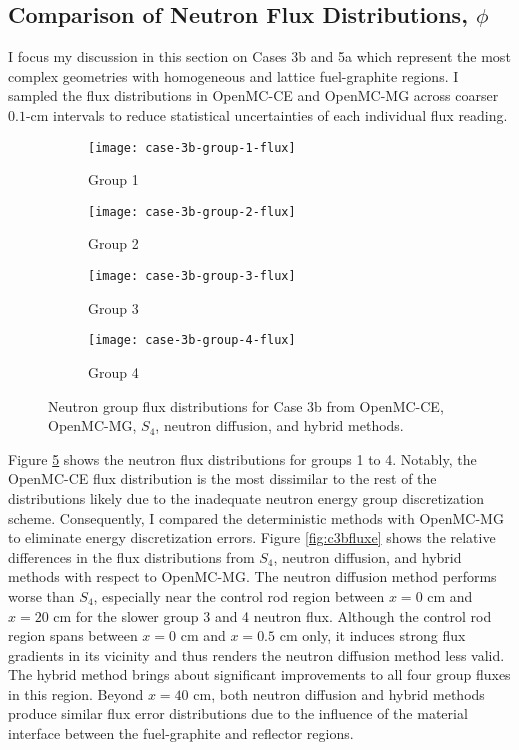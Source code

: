\subsection{Comparison of Neutron Flux Distributions, $\phi$}

I focus my discussion in this section on Cases 3b and 5a which represent the most complex
geometries with homogeneous and lattice fuel-graphite regions. I sampled the flux distributions in
OpenMC-CE and OpenMC-MG across coarser $0.1$-cm intervals to reduce statistical uncertainties of
each individual flux reading.

\begin{figure}[htb!]
  \centering
  \begin{subfigure}[t]{.49\textwidth}
    \centering
    \texttt{[image: case-3b-group-1-flux]}
    \caption{Group 1}
    \label{fig:c3bg1}
  \end{subfigure}
  \hfill
  \begin{subfigure}[t]{.49\textwidth}
    \centering
    \texttt{[image: case-3b-group-2-flux]}
    \caption{Group 2}
    \label{fig:c3bg2}
  \end{subfigure}
  \hfill
  \begin{subfigure}[t]{.49\textwidth}
    \centering
    \texttt{[image: case-3b-group-3-flux]}
    \caption{Group 3}
    \label{fig:c3bg3}
  \end{subfigure}
  \hfill
  \begin{subfigure}[t]{.49\textwidth}
    \centering
    \texttt{[image: case-3b-group-4-flux]}
    \caption{Group 4}
    \label{fig:c3bg4}
  \end{subfigure}
  \caption{Neutron group flux distributions for Case 3b from OpenMC-CE, OpenMC-MG, $S_4$, neutron
  diffusion, and hybrid methods.}
  \label{fig:c3bflux}
\end{figure}

Figure \ref{fig:c3bflux} shows the neutron flux distributions for groups 1 to 4. Notably, the
OpenMC-CE flux distribution is the most dissimilar to the rest of the distributions likely due to
the inadequate neutron energy group discretization scheme. Consequently, I compared the
deterministic methods with OpenMC-MG to eliminate energy discretization errors. Figure
\ref{fig:c3bfluxe} shows the relative differences in the flux distributions from $S_4$, neutron
diffusion, and hybrid methods with respect to OpenMC-MG. The neutron diffusion method
performs worse than $S_4$, especially near the control rod region between $x=0$ cm and $x=20$ cm
for the slower group 3 and 4 neutron flux. Although the control rod region spans between $x=0$ cm
and $x=0.5$ cm only, it induces strong flux gradients in its vicinity and thus renders the neutron
diffusion method less valid. The hybrid method brings about significant improvements to all four
group fluxes in this region. Beyond $x=40$ cm, both neutron diffusion and hybrid methods produce
similar flux error distributions due to the influence of the material interface between the
fuel-graphite and reflector regions.

